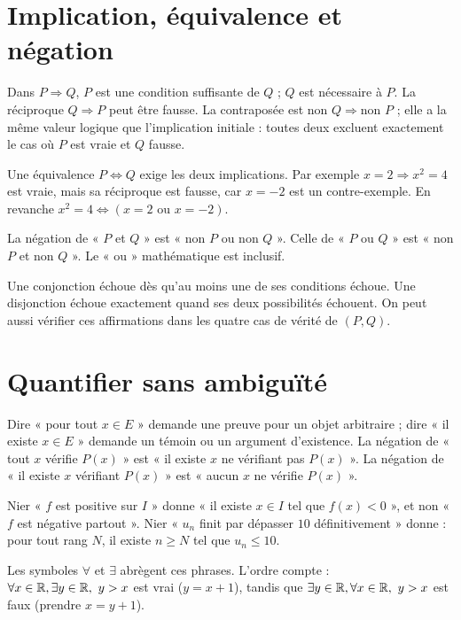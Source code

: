 \documentclass[../cours_1re.tex]{subfiles}
\begin{document}
\section{Implication, équivalence et négation}
Dans $P\Rightarrow Q$, $P$ est une condition suffisante de $Q$ ; $Q$ est nécessaire à $P$. La réciproque $Q\Rightarrow P$ peut être fausse. La contraposée est $\text{non }Q\Rightarrow\text{non }P$ ; elle a la même valeur logique que l'implication initiale : toutes deux excluent exactement le cas où $P$ est vraie et $Q$ fausse.

Une équivalence $P\Leftrightarrow Q$ exige les deux implications. Par exemple $x=2\Rightarrow x^2=4$ est vraie, mais sa réciproque est fausse, car $x=-2$ est un contre-exemple. En revanche $x^2=4\Leftrightarrow(x=2\text{ ou }x=-2)$.
\begin{propriete}
La négation de « $P$ et $Q$ » est « non $P$ ou non $Q$ ». Celle de « $P$ ou $Q$ » est « non $P$ et non $Q$ ». Le « ou » mathématique est inclusif.
\end{propriete}
\begin{demonstration}
Une conjonction échoue dès qu'au moins une de ses conditions échoue. Une disjonction échoue exactement quand ses deux possibilités échouent. On peut aussi vérifier ces affirmations dans les quatre cas de vérité de $(P,Q)$.
\end{demonstration}
\section{Quantifier sans ambiguïté}
Dire « pour tout $x\in E$ » demande une preuve pour un objet arbitraire ; dire « il existe $x\in E$ » demande un témoin ou un argument d'existence.
La négation de « tout $x$ vérifie $P(x)$ » est « il existe $x$ ne vérifiant pas $P(x)$ ». La négation de « il existe $x$ vérifiant $P(x)$ » est « aucun $x$ ne vérifie $P(x)$ ».
\begin{exemple}
Nier « $f$ est positive sur $I$ » donne « il existe $x\in I$ tel que $f(x)<0$ », et non « $f$ est négative partout ». Nier « $u_n$ finit par dépasser $10$ définitivement » donne : pour tout rang $N$, il existe $n\ge N$ tel que $u_n\le10$.
\end{exemple}
\approfondissement Les symboles $\forall$ et $\exists$ abrègent ces phrases. L'ordre compte :
$\forall x\in\mathbb{R},\exists y\in\mathbb{R},\ y>x$ est vrai ($y=x+1$), tandis que
$\exists y\in\R,\forall x\in\R,\ y>x$ est faux (prendre $x=y+1$).
\end{document}
